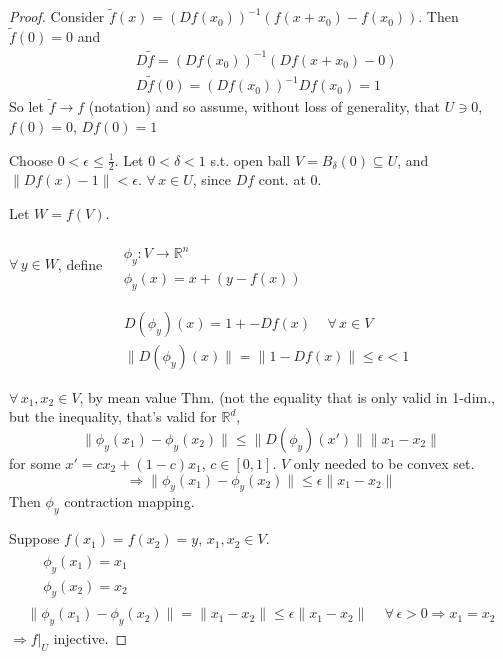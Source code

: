 \begin{proof}


Consider $\widetilde{f}(x) = (Df(x_0))^{-1}(f(x+x_0) - f(x_0))$.  Then \\
\phantom{Consider} $\widetilde{f}(0) = 0$ and 
\[
\begin{aligned}
  &  D\widetilde{f}= (Df(x_0))^{-1}(Df(x+x_0) -0)  \\
  & D\widetilde{f}(0) = (Df(x_0))^{-1}Df(x_0)=1
\end{aligned}
\]  
So let $\widetilde{f}\to f$ (notation) and so assume, without loss of generality, that $U\ni 0$, $f(0)=0$, $Df(0)=1$

Choose $0 < \epsilon \leq \frac{1}{2}$.  Let $0< \delta <1$ s.t. open ball $V = B_{\delta}(0) \subseteq U$, and $\| Df(x)-1\| < \epsilon$.  $\forall \, x \in U$, since $Df$ cont. at $0$.  

Let $W=f(V)$.  

$\forall \, y \in W$, define $\begin{aligned} & \quad \\
  & \phi_y : V \to \mathbb{R}^n \\
  & \phi_y(x) = x + (y-f(x))\end{aligned}$

\[
\begin{aligned}
  & D(\phi_y)(x) = 1 + - Df(x) \quad \, \forall \, x \in V \\ 
  & \| D(\phi_y)(x) \| = \| 1 - Df(x) \| \leq \epsilon <1
\end{aligned}
\]

$\forall \, x_1 ,x_2 \in V$, by mean value Thm. (not the equality that is only valid in 1-dim., but the inequality, that's valid for $\mathbb{R}^d$, 
\[
\| \phi_y(x_1) - \phi_y(x_2) \| \leq \| D(\phi_y)(x') \| \| x_1 - x_2 \| 
\]
for some $x' = cx_2 + (1-c)x_1$, $c\in [0,1]$.  $V$ only needed to be convex set.  
\[
\Longrightarrow \| \phi_y(x_1) - \phi_y(x_2) \| \leq \epsilon \| x_1 - x_2 \|
\]
Then $\phi_y$ contraction mapping.  

Suppose $f(x_1) = f(x_2)=y$, $x_1,x_2 \in V$.  
\[
\begin{gathered}
\begin{aligned}
  & \phi_y(x_1) =x_1 \\ 
  & \phi_y(x_2) =x_2  
\end{aligned} \\
\| \phi_y(x_1) - \phi_y(x_2) \| = \| x_1 - x_2 \| \leq \epsilon \| x_1 - x_2 \| \quad \, \forall \, \epsilon > 0 \Longrightarrow x_1 = x_2 
\end{gathered}
\]
$\Longrightarrow \left. f\right|_U$ injective.


\end{proof}
